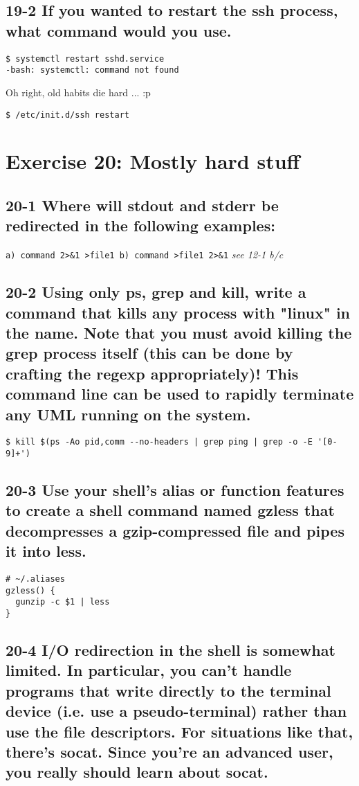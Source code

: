 \subsection{19-2 If you wanted to restart the ssh process, what command would you use.}
\begin{verbatim}
$ systemctl restart sshd.service
-bash: systemctl: command not found
\end{verbatim}

Oh right, old habits die hard ... :p

\verb=$ /etc/init.d/ssh restart=


\section{Exercise 20: Mostly hard stuff}
\subsection{20-1 Where will stdout and stderr be redirected in the following examples:}
\verb=a) command 2>&1 >file1 b) command >file1 2>&1=
\emph{see 12-1 b/c}

\subsection{20-2 Using only ps, grep and kill, write a command that kills any process with "linux" in the name. Note that you must avoid killing the grep process itself (this can be done by crafting the regexp appropriately)! This command line can be used to rapidly terminate any UML running on the system.}
\begin{verbatim}$ kill $(ps -Ao pid,comm --no-headers | grep ping | grep -o -E '[0-9]+')\end{verbatim}

\subsection{20-3 Use your shell's alias or function features to create a shell command named gzless that decompresses a gzip-compressed file and pipes it into less.}
\begin{verbatim}
# ~/.aliases
gzless() {
  gunzip -c $1 | less
}
\end{verbatim}

\subsection{20-4 I/O redirection in the shell is somewhat limited. In particular, you can't handle programs that write directly to the terminal device (i.e. use a pseudo-terminal) rather than use the file descriptors. For situations like that, there's socat. Since you're an advanced user, you really should learn about socat.}
